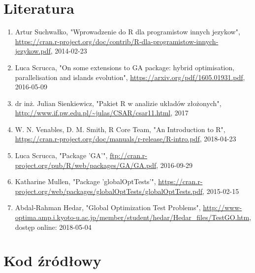 \documentclass{article}
\begin{document}
\section{Literatura}
\begin{enumerate}
\item Artur Suchwałko, "Wprowadzenie do R dla programistow innych jezykow", \url{https://cran.r-project.org/doc/contrib/R-dla-programistow-innych-jezykow.pdf}, 2014-02-23
\item Luca Scrucca, "On some extensions to GA package:
hybrid optimisation, parallelisation and islands evolution", \url{https://arxiv.org/pdf/1605.01931.pdf}, 2016-05-09
\item dr inż. Julian Sienkiewicz, "Pakiet R w analizie układów złożonych", \url{http://www.if.pw.edu.pl/~julas/CSAR/csar11.html}, 2017
\item W. N. Venables, D. M. Smith, R Core Team, "An Introduction to R", \url{https://cran.r-project.org/doc/manuals/r-release/R-intro.pdf}, 2018-04-23
\item Luca Scrucca, "Package 'GA'", \url{ftp://cran.r-project.org/pub/R/web/packages/GA/GA.pdf}, 2016-09-29
\item Katharine Mullen, "Package 'globalOptTests'", \url{https://cran.r-project.org/web/packages/globalOptTests/globalOptTests.pdf},
2015-02-15
\item Abdal-Rahman Hedar, "Global Optimization Test Problems", \url{http://www-optima.amp.i.kyoto-u.ac.jp/member/student/hedar/Hedar_files/TestGO.htm}, dostęp online: 2018-05-04
\end{enumerate}

\section{Kod źródłowy}


%
\end{document}
